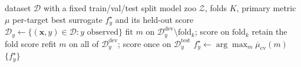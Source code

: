 \begin{algorithm}[!t]
\caption{Cross-validated surrogate selection}
\label{alg:cross_validated_surrogate_selection}
\begin{algorithmic}[1]
\Require dataset $\mathcal{D}$ with a fixed train/val/test split
\Require model zoo $\mathcal{Z}$, folds $K$, primary metric $\mu$
\Ensure per-target best surrogate $f^\star_y$ and its held-out score
        \State $\mathcal{D}_y \leftarrow \{(\mathbf{x},y) \in \mathcal{D} : y \text{ observed}\}$
                \State fit $m$ on $\mathcal{D}_y^{\mathrm{dev}}\setminus \mathrm{fold}_k$; score on $\mathrm{fold}_k$
                \State retain the fold score
            \EndFor
            \State refit $m$ on all of $\mathcal{D}_y^{\mathrm{dev}}$; score once on $\mathcal{D}_y^{\mathrm{test}}$
        \EndFor
        \State $f^\star_y \leftarrow \arg\max_m \overline{\mu}_{\mathrm{cv}}(m)$
    \EndFor
    \Return $\{f^\star_y\}$
\end{algorithmic}
\end{algorithm}
